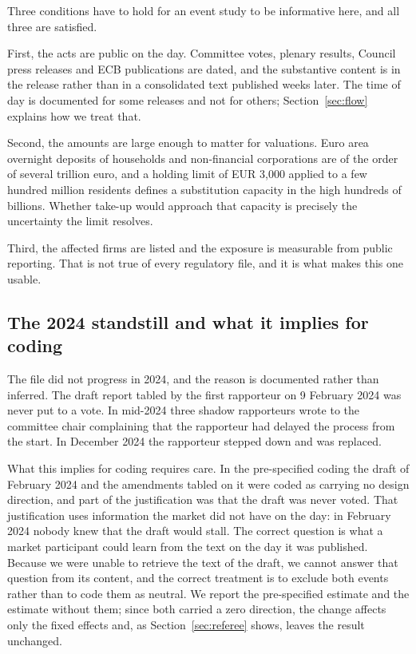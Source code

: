 \documentclass[11pt]{article}
\theoremstyle{plain}\newtheorem{proposition}{Proposition}
\begin{document}
Three conditions have to hold for an event study to be informative here, and all three are satisfied.

First, the acts are public on the day. Committee votes, plenary results, Council press releases and ECB publications are dated, and the substantive content is in the release rather than in a consolidated text published weeks later. The time of day is documented for some releases and not for others; Section~\ref{sec:flow} explains how we treat that.

Second, the amounts are large enough to matter for valuations. Euro area overnight deposits of households and non-financial corporations are of the order of several trillion euro, and a holding limit of EUR 3,000 applied to a few hundred million residents defines a substitution capacity in the high hundreds of billions. Whether take-up would approach that capacity is precisely the uncertainty the limit resolves.

Third, the affected firms are listed and the exposure is measurable from public reporting. That is not true of every regulatory file, and it is what makes this one usable.

\subsection{The 2024 standstill and what it implies for coding}

The file did not progress in 2024, and the reason is documented rather than inferred. The draft report tabled by the first rapporteur on 9 February 2024 was never put to a vote. In mid-2024 three shadow rapporteurs wrote to the committee chair complaining that the rapporteur had delayed the process from the start. In December 2024 the rapporteur stepped down and was replaced.

What this implies for coding requires care. In the pre-specified coding the draft of February 2024 and the amendments tabled on it were coded as carrying no design direction, and part of the justification was that the draft was never voted. That justification uses information the market did not have on the day: in February 2024 nobody knew that the draft would stall. The correct question is what a market participant could learn from the text on the day it was published. Because we were unable to retrieve the text of the draft, we cannot answer that question from its content, and the correct treatment is to exclude both events rather than to code them as neutral. We report the pre-specified estimate and the estimate without them; since both carried a zero direction, the change affects only the fixed effects and, as Section~\ref{sec:referee} shows, leaves the result unchanged.
\end{document}
